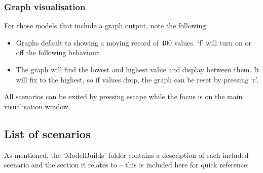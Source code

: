 \subsubsection{Graph visualisation}

For those models that include a graph output, note the following:

\begin{itemize}
	\item Graphs default to showing a moving record of 400 values. `f' will turn on or off the following behaviour.
	\item The graph will find the lowest and highest value and display between them. It will fix to the highest, so if values drop, the graph can be reset by pressing `r'. 
\end{itemize}

All scenarios can be exited by pressing escape while the focus is on the main visualisation window. 

\subsection{List of scenarios}

As mentioned, the `ModelBuilds' folder contains a description of each included scenario and the section it relates to – this is included here for quick reference:

